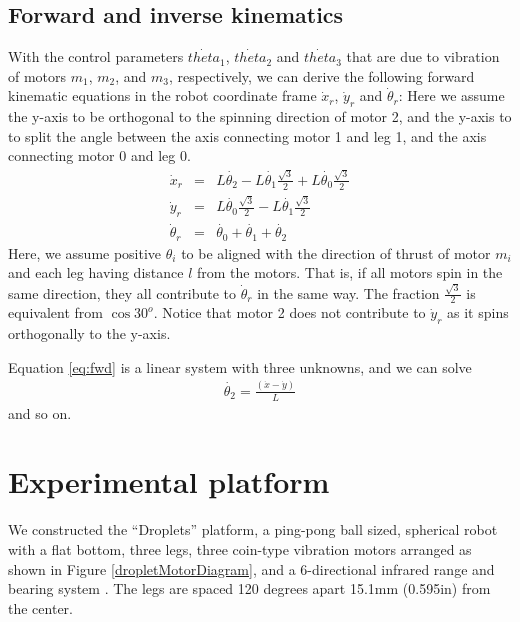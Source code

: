 \documentclass[letterpaper, 10pt, conference]{ieeeconf}
\begin{document}
\subsection{Forward and inverse kinematics}
With the control parameters $\dot{theta}_1$, $\dot{theta}_2$ and $\dot{theta}_3$ that are due to vibration of motors $m_1$, $m_2$, and $m_3$, respectively, we can derive the following forward kinematic equations in the robot coordinate frame $\dot{x}_r$, $\dot{y}_r$ and $\dot{\theta}_r$:
Here we assume the y-axis to be orthogonal to the spinning direction of motor 2, and the y-axis to to split the angle between the axis connecting motor 1 and leg 1, and the axis connecting motor 0 and leg 0.
\begin{eqnarray}\label{eq:fwd}
\dot{x}_r &=& L\dot{\theta_2}-L\dot{\theta_1}\frac{\sqrt{3}}{2}+L\dot{\theta_0}\frac{\sqrt{3}}{2}\\
\nonumber
\dot{y}_r &=& L\dot{\theta_0}\frac{\sqrt{3}}{2} - L\dot{\theta_1}\frac{\sqrt{3}}{2}\\
\nonumber
\dot{\theta}_r &=& \dot{\theta_0} + \dot{\theta_1} + \dot{\theta_2}
\end{eqnarray}
Here, we assume positive $\theta_i$ to be aligned with the direction of thrust of motor $m_i$ and each leg having distance $l$ from the motors. That is, if all motors spin in the same direction, they all contribute to $\dot{\theta}_r$ in the same way. The fraction $\frac{\sqrt{3}}{2}$ is equivalent from $\cos 30^o$. Notice that motor 2 does not contribute to $\dot{y}_r$ as it spins orthogonally to the y-axis.

Equation \ref{eq:fwd} is a linear system with three unknowns, and we can solve
\begin{eqnarray}
\dot{\theta_2}=\frac{(\dot{x}-\dot{y})}{L}
\end{eqnarray}
and so on.



\section{Experimental platform}
We constructed the ``Droplets'' platform, a ping-pong ball sized, spherical robot with a flat bottom, three legs, three coin-type vibration motors arranged as shown in Figure \ref{dropletMotorDiagram}, and a 6-directional infrared range and bearing system \cite{farrow14}. The legs are spaced 120 degrees apart 15.1mm (0.595in) from the center.
\end{document}
